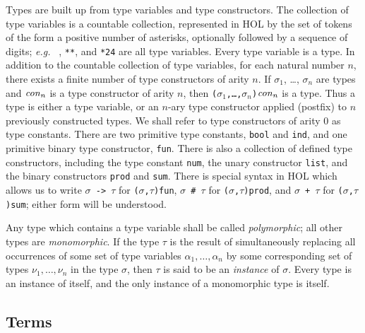 Types are built up from type variables and type constructors.  The
collection of type variables is a countable collection, represented in
HOL by the set of tokens of the form a positive number of asterisks,
optionally followed by a sequence of digits; {\it e.g.}~ {\tt *},
{\tt ***}, and {\tt **24} are all type variables.  Every type variable is
a type.  In addition to the countable collection of type variables, for
each natural number $n$, there exists a finite number of type
constructors of arity $n$.  If $\sigma_1$, \ldots, $\sigma_n$ are
types and ${\it con}_n$ is a type constructor of arity $n$, then
\mbox{\tt ($\sigma_1$,{\rm\ldots},$\sigma_n$)${\it con}_n$} is a type.
Thus a type is either a type variable, or an $n$-ary type constructor
applied (postfix) to $n$ previously constructed types.  We shall refer
to type constructors of arity $0$ as type constants.  There are two
primitive type constants, {\tt bool} and {\tt ind}, and one primitive
binary type constructor, {\tt fun}.  There is also a collection of
defined type constructors, including the type constant {\tt num}, the
unary constructor {\tt list}, and the binary constructors {\tt prod} and
{\tt sum}.  There is special syntax in HOL which allows us to write
\mbox{\tt $\sigma$ -> $\tau$} for
\mbox{\tt ($\sigma$,$\tau$)fun}, \mbox{\tt $\sigma$ \# $\tau$} for
\mbox{\tt ($\sigma$,$\tau$)prod}, and \mbox{\tt $\sigma$ + $\tau$} for
\mbox{\tt ($\sigma$,$\tau$)sum}; either form will be understood.

Any type which contains a type variable shall be called {\it
polymorphic}; all other types are {\it monomorphic}.  If the type
$\tau$ is the result of simultaneously replacing all occurrences of
some set of type variables $\alpha_1,\ldots,\alpha_n$ by some
corresponding set of types $\nu_1,\ldots,\nu_n$ in the type $\sigma$,
then $\tau$ is said to be an {\it instance\/} of $\sigma$.  Every type
is an instance of itself, and the only instance of a monomorphic type
is itself.


\subsection{Terms}

